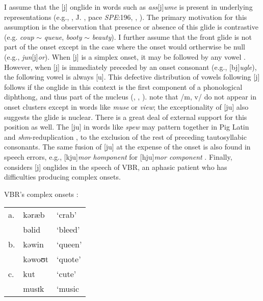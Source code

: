 I assume that the [j] onglide in words such as \emph{ass}[j]\emph{ume} is present in underlying representations (e.g., \citealt[][278]{Borowsky1986}, J. \citealt{Anderson1988b}, pace \emph{SPE}:196, \citealt[][89]{Halle1985a}, \citealt[][217]{McMahon1990}). The primary motivation for this assumption is the observation that presence or absence of this glide is contrastive (e.g. \emph{coup} $\sim$ \emph{queue}, \emph{booty} $\sim$ \emph{beauty}). I further assume that the front glide is not part of the onset except in the case where the onset would ortherwise be null (e.g., \emph{jun}[j]\emph{or}).
When [j] is a simplex onset, it may be followed by any vowel \citep[][276]{Borowsky1986}. However, when [j] is immediately preceded by an onset consonant (e.g., [bj]\emph{ugle}), the following vowel is always [u\lm]. This defective distribution of vowels following [j] follows if the onglide in this context is the first component of a phonological diphthong, and thus part of the nucleus (\citealp[][232]{Hayes1980}, \citealp[][61f.]{Harris1994}, \citealp{Davis1995}). \citet[][42]{Clements1983} note that /m, v/ do not appear in onset clusters except in words like \emph{muse} or \emph{view}; the exceptionality of [ju\lm] also suggests the glide is nuclear. There is a great deal of external support for this position as well. The [ju\lm] in words like \emph{spew} may pattern together
in Pig Latin \citep{Davis1995,Idsardi2005} and \emph{shm}-reduplication \citep{Nevins2003}, to the exclusion of the rest of preceding tautosyllabic consonants. The same fusion of [ju\lm] at the expense of the onset is also found in speech errors, e.g., [kju\lm]\emph{mor homponent} for [hju\lm]\emph{mor component} \citep[][130]{Shattuck-Hufnagel1986}. Finally, \citet{Buchwald2005} considers [j] onglides in the speech of VBR, an aphasic patient who has difficulties producing complex onsets. 

\ex VBR's complex onsets \citep[79--80, his transcriptions]{Buchwald2005}: \\
\begin{tabular}{l l l}
a. & kəræb  & `crab'  \\
   & bəlid  & `bleed' \\
b. & kəwin  & `queen' \\
   & kəwoʊt & `quote' \\
c. & kut    & `cute'  \\
   & musɪk  & `music  \\ 
\end{tabular}
\xe

